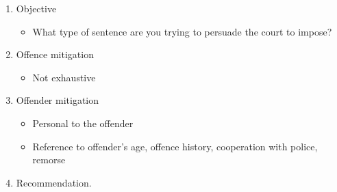 \documentclass[
]{article}
\providecommand{\tightlist}{%
  \setlength{\itemsep}{0pt}\setlength{\parskip}{0pt}}
\begin{document}
\begin{enumerate}
\def\labelenumi{\arabic{enumi}.}
\tightlist
\item
  Objective

  \begin{itemize}
  \tightlist
  \item
    What type of sentence are you trying to persuade the court to
    impose?
  \end{itemize}
\item
  Offence mitigation

  \begin{itemize}
  \tightlist
  \item
    Not exhaustive
  \end{itemize}
\item
  Offender mitigation

  \begin{itemize}
  \tightlist
  \item
    Personal to the offender
  \item
    Reference to offender's age, offence history, cooperation with
    police, remorse
  \end{itemize}
\item
  Recommendation.
\end{enumerate}
\end{document}
